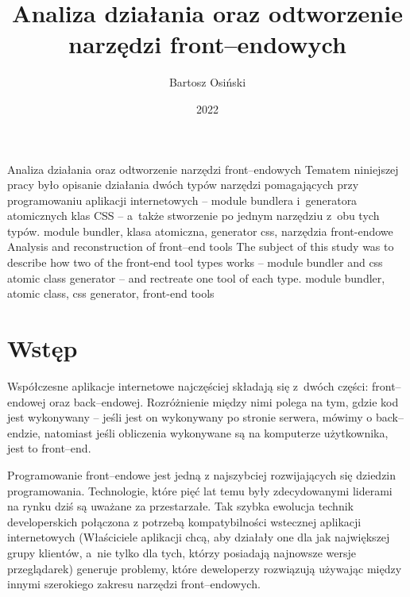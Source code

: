 \documentclass{SGGW-thesis}
\title{Analiza działania oraz odtworzenie narzędzi front--endowych}
\author{Bartosz Osiński}
\date{2022}
\begin{document}
\maketitle
\statementpage
\abstractpage %
{Analiza działania oraz odtworzenie narzędzi front–endowych}
{Tematem niniejszej pracy było opisanie działania dwóch typów narzędzi pomagających przy programowaniu aplikacji internetowych -- module bundlera i~generatora atomicznych klas CSS -- a~także stworzenie po jednym narzędziu z~obu tych typów.}
{module bundler, klasa atomiczna, generator css, narzędzia front-endowe}
{Analysis and reconstruction of front--end tools}
{The subject of this study was to describe how two of the front-end tool types works -- module bundler and css atomic class generator -- and rectreate one tool of each type.}
{module bundler, atomic class, css generator, front-end tools}


\tableofcontents

\startchapterfromoddpage %


\chapter{Wstęp}
Współczesne aplikacje internetowe najczęściej składają się z~dwóch części: front--endowej oraz back--endowej. Rozróżnienie między nimi polega na tym, gdzie kod jest wykonywany -- jeśli jest on wykonywany po stronie serwera, mówimy o back--endzie, natomiast jeśli obliczenia wykonywane są na komputerze użytkownika, jest to front--end.

Programowanie front--endowe jest jedną z najszybciej rozwijających się dziedzin programowania. Technologie, które pięć lat temu były zdecydowanymi liderami na rynku dziś są uważane za przestarzałe. Tak szybka ewolucja technik developerskich połączona z potrzebą kompatybilności wstecznej aplikacji internetowych (Właściciele aplikacji chcą, aby działały one dla jak największej grupy klientów, a~nie tylko dla tych, którzy posiadają najnowsze wersje przeglądarek) generuje problemy, które deweloperzy rozwiązują używając między innymi szerokiego zakresu narzędzi front--endowych.
\end{document}
